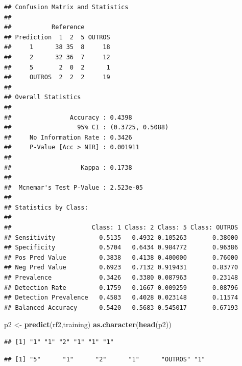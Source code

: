 \documentclass[]{article}
\newenvironment{Shaded}{\begin{snugshade}}{\end{snugshade}}
\newcommand{\DataTypeTok}[1]{\textcolor[rgb]{0.13,0.29,0.53}{#1}}
\newcommand{\DecValTok}[1]{\textcolor[rgb]{0.00,0.00,0.81}{#1}}
\newcommand{\KeywordTok}[1]{\textcolor[rgb]{0.13,0.29,0.53}{\textbf{#1}}}
\newcommand{\NormalTok}[1]{#1}
\newcommand{\OperatorTok}[1]{\textcolor[rgb]{0.81,0.36,0.00}{\textbf{#1}}}
\newcommand{\StringTok}[1]{\textcolor[rgb]{0.31,0.60,0.02}{#1}}
\begin{document}
\begin{verbatim}
## Confusion Matrix and Statistics
## 
##           Reference
## Prediction  1  2  5 OUTROS
##     1      38 35  8     18
##     2      32 36  7     12
##     5       2  0  2      1
##     OUTROS  2  2  2     19
## 
## Overall Statistics
##                                           
##                Accuracy : 0.4398          
##                  95% CI : (0.3725, 0.5088)
##     No Information Rate : 0.3426          
##     P-Value [Acc > NIR] : 0.001911        
##                                           
##                   Kappa : 0.1738          
##                                           
##  Mcnemar's Test P-Value : 2.523e-05       
## 
## Statistics by Class:
## 
##                      Class: 1 Class: 2 Class: 5 Class: OUTROS
## Sensitivity            0.5135   0.4932 0.105263       0.38000
## Specificity            0.5704   0.6434 0.984772       0.96386
## Pos Pred Value         0.3838   0.4138 0.400000       0.76000
## Neg Pred Value         0.6923   0.7132 0.919431       0.83770
## Prevalence             0.3426   0.3380 0.087963       0.23148
## Detection Rate         0.1759   0.1667 0.009259       0.08796
## Detection Prevalence   0.4583   0.4028 0.023148       0.11574
## Balanced Accuracy      0.5420   0.5683 0.545017       0.67193
\end{verbatim}

\begin{Shaded}
\begin{Highlighting}[]
\NormalTok{p2 <-}\StringTok{ }\KeywordTok{predict}\NormalTok{(rf2,training)}
\KeywordTok{as.character}\NormalTok{(}\KeywordTok{head}\NormalTok{(p2))}
\end{Highlighting}
\end{Shaded}

\begin{verbatim}
## [1] "1" "1" "2" "1" "1" "1"
\end{verbatim}

\begin{Shaded}
\end{Shaded}

\begin{verbatim}
## [1] "5"      "1"      "2"      "1"      "OUTROS" "1"
\end{verbatim}

\begin{Shaded}
\end{Shaded}
\end{document}
